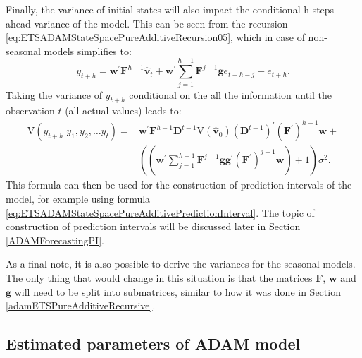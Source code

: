 \documentclass[
]{book}
\theoremstyle{definition}
\theoremstyle{definition}
\theoremstyle{definition}
\theoremstyle{definition}
\theoremstyle{remark}
\begin{document}
Finally, the variance of initial states will also impact the conditional h steps ahead variance of the model. This can be seen from the recursion \eqref{eq:ETSADAMStateSpacePureAdditiveRecursion05}, which in case of non-seasonal models simplifies to:
\begin{equation}
    y_{t+h} = \mathbf{w}^\prime \mathbf{F}^{h-1} \hat{\mathbf{v}}_{t} + \mathbf{w}^\prime \sum_{j=1}^{h-1} \mathbf{F}^{j-1} \mathbf{g} e_{t+h-j} + e_{t+h} .
  \label{eq:ETSADAMStateSpacePureAdditiveForecastVariance01}
\end{equation}
Taking the variance of \(y_{t+h}\) conditional on the all the information until the observation \(t\) (all actual values) leads to:
\begin{equation}
    \begin{aligned}
    \mathrm{V}( y_{t+h} | y_1, y_2, \dots y_t) = & \mathbf{w}^\prime \mathbf{F}^{h-1} \mathbf{D}^{t-1} \mathrm{V}\left( \hat{\mathbf{v}}_{0} \right) \left(\mathbf{D}^{t-1}\right)^\prime (\mathbf{F}^\prime)^{h-1} \mathbf{w} + \\
                                                 & \left( \left(\mathbf{w}^\prime \sum_{j=1}^{h-1} \mathbf{F}^{j-1} \mathbf{g} \mathbf{g}^\prime (\mathbf{F}^\prime)^{j-1} \mathbf{w} \right) + 1 \right) \sigma^2 .
    \end{aligned}
  \label{eq:ETSADAMStateSpacePureAdditiveForecastVariance02}
\end{equation}
This formula can then be used for the construction of prediction intervals of the model, for example using formula \eqref{eq:ETSADAMStateSpacePureAdditivePredictionInterval}. The topic of construction of prediction intervals will be discussed later in Section \ref{ADAMForecastingPI}.

As a final note, it is also possible to derive the variances for the seasonal models. The only thing that would change in this situation is that the matrices \(\mathbf{F}\), \(\mathbf{w}\) and \(\mathbf{g}\) will need to be split into submatrices, similar to how it was done in Section \ref{adamETSPureAdditiveRecursive}.

\hypertarget{estimated-parameters-of-adam-model}{%
\subsection{Estimated parameters of ADAM model}\label{estimated-parameters-of-adam-model}}
\end{document}
